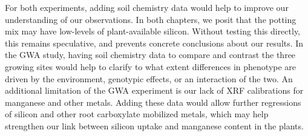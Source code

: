 \documentclass[12pt, letterpaper]{report}
\begin{document}
For both experiments, adding soil chemistry data would help to improve our understanding of our observations. In both chapters, we posit that the potting mix may have low-levels of plant-available silicon. Without testing this directly, this remains speculative, and prevents concrete conclusions about our results. In the GWA study, having soil chemistry data to compare and contrast the three growing sites would help to clarify to what extent differences in phenotype are driven by the environment, genotypic effects, or an interaction of the two. An additional limitation of the GWA experiment is our lack of XRF calibrations for manganese and other metals. Adding these data would allow further regressions of silicon and other root carboxylate mobilized metals, which may help strengthen our link between silicon uptake and manganese content in the plants.

\printbibliography
\end{document}
